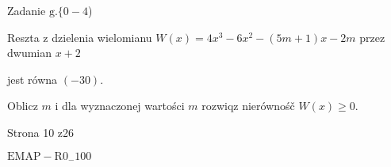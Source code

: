 \documentclass[a4paper,12pt]{article}
\begin{document}
Zadanie $\mathrm{g}. \{0-4$)

Reszta z dzielenia wielomianu $W(x)=4x^{3}-6x^{2}-(5m+1)x-2m$ przez dwumian $x+2$

jest równa $(-30).$

Oblicz $m$ i dla wyznaczonej wartości $m$ rozwiqz nierównośč $W(x)\geq 0.$

Strona 10 z26

$\mathrm{E}\mathrm{M}\mathrm{A}\mathrm{P}-\mathrm{R}0_{-}100$
\end{document}

